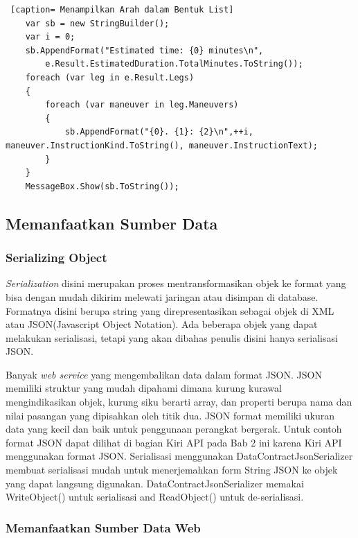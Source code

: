 \begin{lstlisting} [caption= Menampilkan Arah dalam Bentuk List]
	var sb = new StringBuilder();
	var i = 0;
	sb.AppendFormat("Estimated time: {0} minutes\n",
		e.Result.EstimatedDuration.TotalMinutes.ToString());
	foreach (var leg in e.Result.Legs)
	{
		foreach (var maneuver in leg.Maneuvers)
		{
			sb.AppendFormat("{0}. {1}: {2}\n",++i, maneuver.InstructionKind.ToString(), maneuver.InstructionText);
		}
	}
	MessageBox.Show(sb.ToString());
\end{lstlisting}

\subsection{Memanfaatkan Sumber Data}
\label{subsec:Memanfaatkan Sumber Data}

\subsubsection{Serializing Object}
\label{subsubsec:Serializing Object}
\hspace{0.5cm} \textit{Serialization} disini merupakan proses mentransformasikan objek ke format yang bisa dengan mudah dikirim melewati jaringan atau disimpan di database. Formatnya disini berupa string yang direpresentasikan sebagai objek di XML atau JSON(Javascript Object Notation). Ada beberapa objek yang dapat melakukan serialisasi, tetapi yang akan dibahas penulis disini hanya serialisasi JSON. 

\hspace{0.5cm} Banyak \textit{web service} yang mengembalikan data dalam format JSON. JSON memiliki struktur yang mudah dipahami dimana kurung kurawal mengindikasikan objek, kurung siku berarti array, dan properti berupa nama dan nilai pasangan yang dipisahkan oleh titik dua. JSON format memiliki ukuran data yang kecil dan baik untuk penggunaan perangkat bergerak. Untuk contoh format JSON dapat dilihat di bagian Kiri API pada Bab 2 ini karena Kiri API menggunakan format JSON. Serialisasi menggunakan DataContractJsonSerializer membuat serialisasi mudah untuk menerjemahkan form String JSON ke objek yang dapat langsung digunakan. DataContractJsonSerializer memakai WriteObject() untuk serialisasi and ReadObject() untuk de-serialisasi.

\subsubsection{Memanfaatkan Sumber Data Web}
\label{subsubsec:Memanfaatkan Sumber Data Web}

